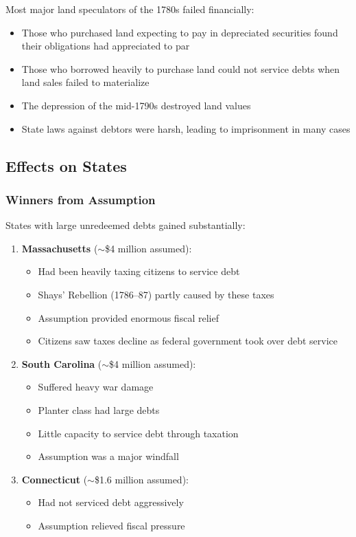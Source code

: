\documentclass[12pt]{article}
\begin{document}
Most major land speculators of the 1780s failed financially:
\begin{itemize}
\item Those who purchased land expecting to pay in depreciated securities found their obligations had appreciated to par
\item Those who borrowed heavily to purchase land could not service debts when land sales failed to materialize
\item The depression of the mid-1790s destroyed land values
\item State laws against debtors were harsh, leading to imprisonment in many cases
\end{itemize}

\subsection{Effects on States}

\subsubsection{Winners from Assumption}

States with large unredeemed debts gained substantially:

\begin{enumerate}
\item \textbf{Massachusetts} ($\sim$\$4 million assumed):
\begin{itemize}
\item Had been heavily taxing citizens to service debt
\item Shays' Rebellion (1786--87) partly caused by these taxes
\item Assumption provided enormous fiscal relief
\item Citizens saw taxes decline as federal government took over debt service
\end{itemize}

\item \textbf{South Carolina} ($\sim$\$4 million assumed):
\begin{itemize}
\item Suffered heavy war damage
\item Planter class had large debts
\item Little capacity to service debt through taxation
\item Assumption was a major windfall
\end{itemize}

\item \textbf{Connecticut} ($\sim$\$1.6 million assumed):
\begin{itemize}
\item Had not serviced debt aggressively
\item Assumption relieved fiscal pressure
\end{itemize}
\end{enumerate}
\end{document}
